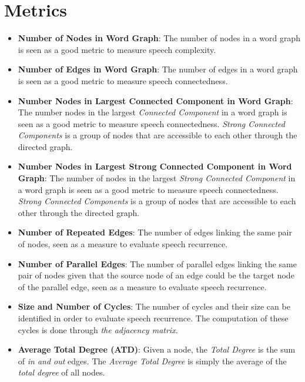 \documentclass{Paper_Summary}
\begin{document}
\section{Metrics}
    \begin{itemize}
        \item \textbf{Number of Nodes in Word Graph}: The number of nodes in a word graph is seen as a good metric to measure speech complexity.
        \item \textbf{Number of Edges in Word Graph}: The number of edges in a word graph is seen as a good metric to measure speech connectedness.
        \item \textbf{Number Nodes in Largest Connected Component in Word Graph}: The number nodes in the largest \emph{Connected Component} in a word graph is seen as a good metric to measure speech connectedness. \emph{Strong Connected Components} is a group of nodes that are accessible to each other through the directed graph.
        \item \textbf{Number Nodes in Largest Strong Connected Component in Word Graph}: The number of nodes in the largest \emph{Strong Connected Component} in a word graph is seen as a good metric to measure speech connectedness. \emph{Strong Connected Components} is a group of nodes that are accessible to each other through the directed graph.
        \item \textbf{Number of Repeated Edges}: The number of edges linking the same pair of nodes, seen as a measure to evaluate speech recurrence.
        \item \textbf{Number of Parallel Edges}: The number of parallel edges linking the same pair of nodes given that the source node of an edge could be the target node of the parallel edge, seen as a measure to evaluate speech recurrence.
        \item \textbf{Size and Number of Cycles}: The number of cycles and their size can be identified in order to evaluate speech recurrence. The computation of these cycles is done through \emph{the adjacency matrix}.
        \item \textbf{Average Total Degree (ATD)}: Given a node, the \emph{Total Degree} is the sum of \emph{in and out} edges. The \emph{Average Total Degree} is simply the average of the \emph{total degree} of all nodes.

\end{itemize}
\end{document}
